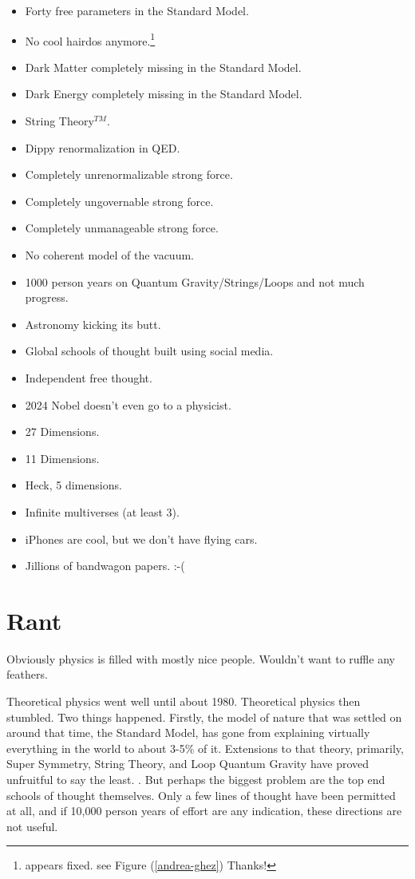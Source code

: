 \documentclass[../rzero]{subfiles}
\begin{document}
\begin{itemize}
  \item Forty free parameters in the Standard Model.
  \item No cool hairdos anymore.\footnote{appears fixed. see Figure (\ref{andrea-ghez}) Thanks!}
  \item Dark Matter completely missing in the Standard Model.
  \item Dark Energy completely missing in the Standard Model.
  \item String Theory$^{TM}$.
  \item Dippy renormalization in QED.
  \item Completely unrenormalizable strong force.
  \item Completely ungovernable strong force.
  \item Completely unmanageable strong force.
  \item No coherent model of the vacuum.
  \item 1000 person years on Quantum Gravity/Strings/Loops and not much progress.
  \item Astronomy kicking its butt.
  \item Global schools of thought built using social media.
  \item Independent free thought.
  \item 2024 Nobel doesn't even go to a physicist.
  \item 27 Dimensions.
  \item 11 Dimensions.
  \item Heck, 5 dimensions.
  \item Infinite multiverses (at least 3).
  \item iPhones are cool, but we don't have flying cars.
  \item Jillions of bandwagon papers. :-(
\end{itemize}

\section{Rant}
Obviously physics is filled with mostly nice people. Wouldn't want to ruffle any feathers.

Theoretical physics went well until about 1980. Theoretical physics then stumbled. Two things happened. Firstly, the model of nature that was settled on around that time, the Standard Model, has gone from explaining virtually everything in the world to about 3-5\% of it. Extensions to that theory, primarily, Super Symmetry, String Theory, and Loop Quantum Gravity have proved unfruitful to say the least. \cite{woit2007not}\cite{smolin2007trouble}\cite{hossenfelder2018lost}. But perhaps the biggest problem are the top end schools of thought themselves. Only a few lines of thought have been permitted at all, and if 10,000 person years of effort are any indication, these directions are not useful. 
\end{document}
